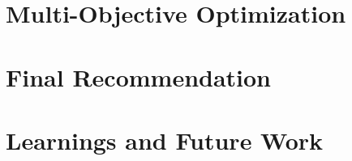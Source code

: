 \documentclass[balance,upint,subscriptcorrection,varvw,mathalfa=cal=boondoxo,spanish,french,vietnamese,russian,greek,pdf-a,colorlinks]{asmeconf}
\begin{document}
 


\section{Multi-Objective Optimization}

\section{Final Recommendation}

\section{Learnings and Future Work}














\end{document}
